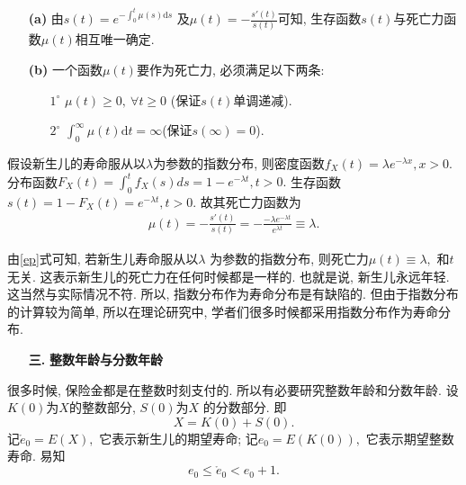 \documentclass[a4paper,openany, 10pt]{ctexbook}
\newcommand{\hei}{\CJKfamily{hei}}      %
\begin{document}
\begin{remark}
    \begin{enumerate}
        \item[{\bf(a)}] 由$s(t) = e^{-\int_{0}^{t}\mu(s)\mathrm{d}s}$ 及$ \mu(t) = -\frac{s'(t)}{s(t)}$可知, 生存函数$s(t)$与死亡力函数$\mu(t)$相互唯一确定.
        \item[{\bf(b)}] 一个函数$\mu(t)$要作为死亡力, 必须满足以下两条:
            \begin{enumerate}
                \item[ $ 1^\circ$] $\mu(t) \geq 0, ~\forall t \geq 0$ (保证$s(t)$单调递减).
                \item[$2^\circ$] $\int_0^{\infty}\mu(t)\mathrm{d}t = \infty$(保证$s(\infty)=0$).
            \end{enumerate}
    \end{enumerate}

\end{remark}




\begin{example}
    假设新生儿的寿命服从以$\lambda$为参数的指数分布, 则密度函数$f_X(t)=\lambda e^{-\lambda x},x>0.$ 分布函数$F_X(t)=\int_0^t f_X(s)ds=1-e^{-\lambda t}, t>0.$ 生存函数$s(t)=1-F_X(t)=e^{-\lambda t},t>0.$  故其死亡力函数为
    \begin{align}\label{ep}
        \mu(t)=-\frac{s'(t)}{s(t)}=-\frac{-\lambda e^{-\lambda t}}{e^{\lambda t}}\equiv\lambda.
    \end{align}
\end{example}

\begin{remark}
    由\eqref{ep}式可知, 若新生儿寿命服从以$\lambda$ 为参数的指数分布, 则死亡力$\mu(t)\equiv \lambda,$ 和$t$ 无关. 这表示新生儿的死亡力在任何时候都是一样的. 也就是说, 新生儿永远年轻. 这当然与实际情况不符. 所以, 指数分布作为寿命分布是有缺陷的. 但由于指数分布的计算较为简单, 所以在理论研究中, 学者们很多时候都采用指数分布作为寿命分布.
\end{remark}
\begin{itemize}
    \item[{\bf\hei 三.}]{\hei\bf 整数年龄与分数年龄}
\end{itemize}
很多时候, 保险金都是在整数时刻支付的. 所以有必要研究整数年龄和分数年龄. 设$K(0)$为$X$的整数部分, $S(0)$为$X$ 的分数部分. 即
$$X = K(0) + S(0).$$
记$\mathring{e}_0 = E(X),$ 它表示新生儿的期望寿命; 记$e_0 = E(K(0)),$ 它表示期望整数寿命. 易知
\begin{equation*}
    e_0 \le \mathring{e}_0 < e_0 + 1.
\end{equation*}
\end{document}
